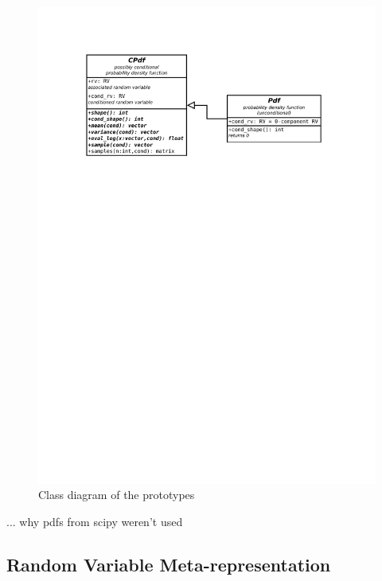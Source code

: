 \begin{figure}[h]
	\centering
	\includegraphics[width=\textwidth,keepaspectratio=true,clip=true,trim=3cm 204mm 3cm 3cm]{./diagrams/pdfs.pdf}
	\vspace{-8mm}
	\caption{Class diagram of the {\pdf} prototypes}
	\label{fig:DiaPdfs}
\end{figure}

... why pdfs from scipy weren't used

\subsection{Random Variable Meta-representation}


